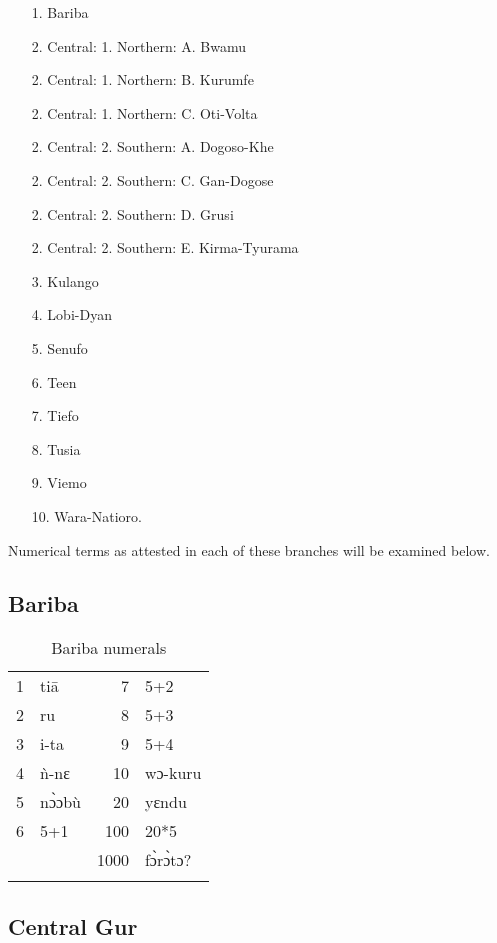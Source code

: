 \begin{itemize} 
\item[1.]Bariba
\item[2.]Central: 1. Northern: A. Bwamu
\item[2.]Central: 1. Northern: B. Kurumfe
\item[2.]Central: 1. Northern: C. Oti-Volta
\item[2.]Central: 2. Southern: A. Dogoso-Khe
\item[2.]Central: 2. Southern: C. Gan-Dogose
\item[2.]Central: 2. Southern: D. Grusi
\item[2.]Central: 2. Southern: E. Kirma-Tyurama
\item[3.]Kulango
\item[4.]Lobi-Dyan
\item[5.]Senufo
\item[6.]Teen
\item[7.]Tiefo
\item[8.]Tusia
\item[9.]Viemo
\item[10.] Wara-Natioro.
\end{itemize}

Numerical terms as attested in each of these branches will be examined below.

 
\subsection{Bariba}%
\begin{table}
\caption{\label{tab:3:163}Bariba numerals}
\begin{tabularx}{\textwidth}{lXrl}
\lsptoprule
{1} & tiā & {7} & 5+2\\
{2} & ru & {8} & 5+3\\
{3} & i-ta & {9} & 5+4\\
{4} & {\`{n}}-nɛ & {10} & wɔ-kuru\\
{5} & n{\`{ɔ}}ɔbù & {20} & yɛndu\\
{6} & 5+1 & {100} & 20*5\\
&  & {1000} & f{\`{ɔ}}r{\`{ɔ}}tɔ? \\
\lspbottomrule
\end{tabularx}
\end{table}


\subsection{Central Gur}%
